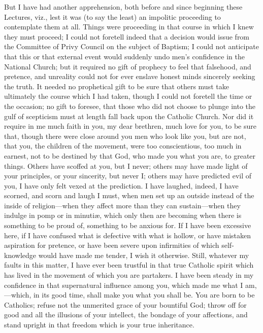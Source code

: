 But I have had another apprehension, both before and since
beginning these Lectures, viz., lest it was (to say the least) an
impolitic proceeding to contemplate them at all. Things were
proceeding in that course in which I knew they must proceed; I could
not foretell indeed that a decision would issue from the Committee of
Privy Council on the subject of Baptism; I could not anticipate that
this or that external event would suddenly undo men's confidence in
the National Church; but it required no gift of prophecy to feel that
falsehood, and pretence, and unreality could not for ever enslave
honest minds sincerely seeking the truth. It needed no prophetical
gift to be sure that others must take ultimately the course which I
had taken, though I could not foretell the time or the occasion; no
gift to foresee, that those who did not choose to plunge into the gulf
of scepticism must at length fall back upon the Catholic Church. Nor
did it require in me much faith in you, my dear brethren, much love
for you, to be sure that, though there were close around you men who
look like you, but are not, that you, the children of the movement,
were too conscientious, too much in earnest, not to be destined by
that God, who made you what you are, to greater things. Others have
scoffed at you, but I never; others may have made light of your
principles, or your sincerity, but never I; others may have predicted
evil of you, I have only felt vexed at the prediction. I have laughed,
indeed, I have scorned, and scorn and laugh I must, when men set up an
outside instead of the inside of religion—when they affect more than
they can sustain—when they indulge in pomp or in minutiæ, which
only then are becoming when there is something to be proud of,
something to be anxious for. If I have been excessive here, if I have
confused what is defective with what is hollow, or have mistaken
aspiration for pretence, or have been severe upon infirmities of which
self-knowledge would have made me tender, I wish it otherwise. Still,
whatever my faults in this matter, I have ever been trustful in that
true Catholic spirit which has lived in the movement of which you are
partakers. I have been steady in my confidence in that supernatural
influence among you, which made me what I am,—which, in its good
time, shall make you what you shall be. You are born to be Catholics;
refuse not the unmerited grace of your bountiful God; throw off for
good and all the illusions of your intellect, the bondage of your
affections, and stand upright in that freedom which is your true
inheritance.

